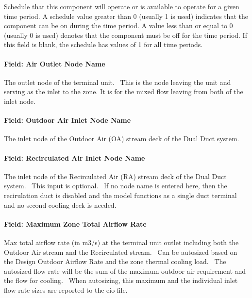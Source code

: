Schedule that this component will operate or is available to operate for a given time period. A schedule value greater than 0 (usually 1 is used) indicates that the component can be on during the time period. A value less than or equal to 0 (usually 0 is used) denotes that the component must be off for the time period. If this field is blank, the schedule has values of 1 for all time periods.

\paragraph{Field: Air Outlet Node Name}\label{field-air-outlet-node-name-9}

The outlet node of the terminal unit.~ This is the node leaving the unit and serving as the inlet to the zone. It is for the mixed flow leaving from both of the inlet node.

\paragraph{Field: Outdoor Air Inlet Node Name}\label{field-outdoor-air-inlet-node-name}

The inlet node of the Outdoor Air (OA) stream deck of the Dual Duct system.

\paragraph{Field: Recirculated Air Inlet Node Name}\label{field-recirculated-air-inlet-node-name}

The inlet node of the Recirculated Air (RA) stream deck of the Dual Duct system. ~This input is optional.~ If no node name is entered here, then the recirulation duct is disabled and the model functions as a single duct terminal and no second cooling deck is needed.

\paragraph{Field: Maximum Zone Total Airflow Rate}\label{field-maximum-zone-total-airflow-rate}

Max total airflow rate (in m3/s) at the terminal unit outlet including both the Outdoor Air stream and the Recirculated stream.~ Can be autosized based on the Design Outdoor Airflow Rate and the zone thermal cooling load.~ The autosized flow rate will be the sum of the maximum outdoor air requirement and the flow for cooling. ~When autosizing, this maximum and the individual inlet flow rate sizes are reported to the eio file.

